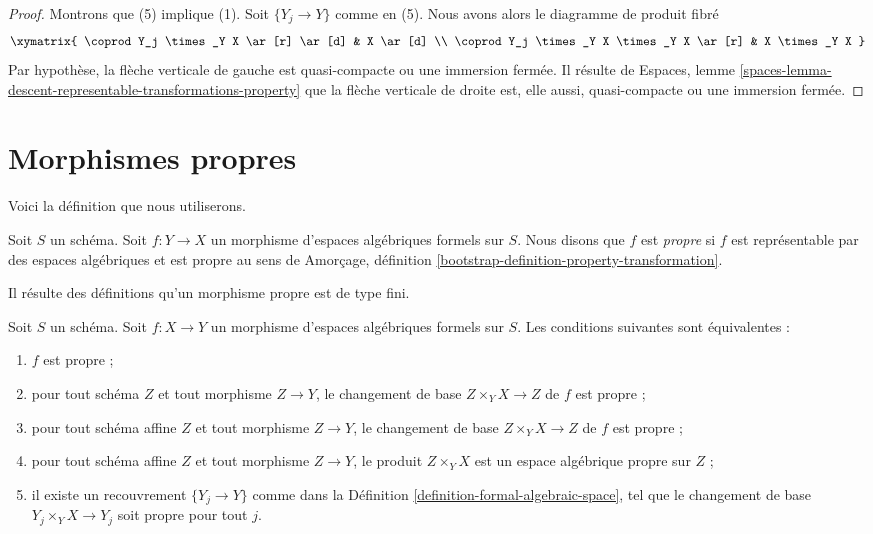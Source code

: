 \begin{proof}
\medskip\noindent
Montrons que (5) implique (1). Soit $\{Y_j \to Y\}$ comme en (5).
Nous avons alors le diagramme de produit fibré
$$
\xymatrix{
\coprod Y_j \times_Y X \ar[r] \ar[d] &
X \ar[d] \\
\coprod Y_j \times_Y X \times_Y X \ar[r] &
X \times_Y X
}
$$
Par hypothèse, la flèche verticale de gauche est quasi-compacte ou une immersion fermée.
Il résulte de
Espaces, lemme \ref{spaces-lemma-descent-representable-transformations-property}
que la flèche verticale de droite est, elle aussi, quasi-compacte ou une
immersion fermée.
\end{proof}







\section{Morphismes propres}
\label{section-proper}

\noindent
Voici la définition que nous utiliserons.

\begin{definition}
\label{definition-proper}
Soit $S$ un schéma. Soit $f : Y \to X$ un morphisme d'espaces algébriques formels
sur $S$. Nous disons que $f$ est {\it propre}
si $f$ est représentable par des espaces algébriques et est propre au sens de
Amorçage, définition \ref{bootstrap-definition-property-transformation}.
\end{definition}

\noindent
Il résulte des définitions qu'un morphisme propre est de type fini.

\begin{lemma}
\label{lemma-proper-local}
Soit $S$ un schéma. Soit $f : X \to Y$ un morphisme d'espaces algébriques formels
sur $S$. Les conditions suivantes sont équivalentes :
\begin{enumerate}
\item $f$ est propre ;
\item pour tout schéma $Z$ et tout morphisme $Z \to Y$, le
changement de base $Z \times_Y X \to Z$ de $f$ est propre ;
\item pour tout schéma affine $Z$ et tout morphisme $Z \to Y$, le
changement de base $Z \times_Y X \to Z$ de $f$ est propre ;
\item pour tout schéma affine $Z$ et tout morphisme $Z \to Y$, le
produit $Z \times_Y X$ est un espace algébrique propre sur $Z$ ;
\item il existe un recouvrement $\{Y_j \to Y\}$ comme dans la
Définition \ref{definition-formal-algebraic-space},
tel que le changement de base $Y_j \times_Y X \to Y_j$ soit propre pour tout $j$.
\end{enumerate}
\end{lemma}


